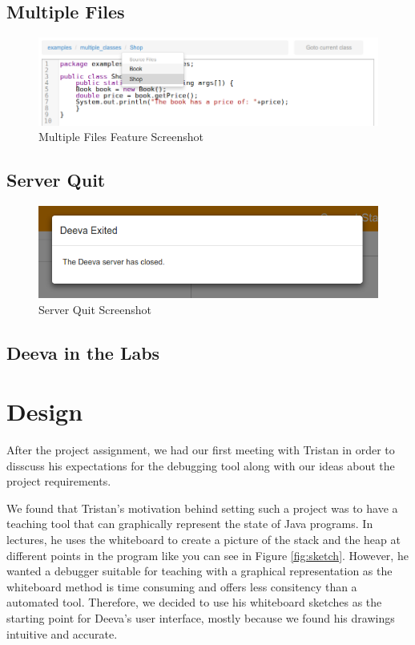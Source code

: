 \documentclass[11pt, a4paper]{article}
\begin{document}
\subsection{Multiple Files}
\begin{figure}[h!]
\centering
\includegraphics[scale=0.5]{multipleFileFeature.png}
\caption{Multiple Files Feature Screenshot}
\label{fig:multipleFile}
\end{figure}

\subsection{Server Quit}
\begin{figure}[h!]
\centering
\includegraphics[scale=0.6]{exitFeature.png}
\caption{Server Quit Screenshot}
\label{fig:quitFeature}
\end{figure}

\subsection{Deeva in the Labs}

\section{Design}

After the project assignment, we had our first meeting with Tristan in order to disscuss his expectations for the debugging tool along with our ideas about the project requirements. 

We found that Tristan's motivation behind setting such a project was to have a teaching tool that can graphically represent the state of Java programs. In lectures, he uses the whiteboard to create a picture of the stack and the heap at different points in the program like you can see in Figure \ref{fig:sketch}. However, he wanted a debugger suitable for teaching with a graphical representation as the whiteboard method is time consuming and offers less consitency than a automated tool. 
Therefore, we decided to use his whiteboard sketches as the starting point for Deeva's user interface, mostly because we found his drawings intuitive and accurate.
 
\end{document}
